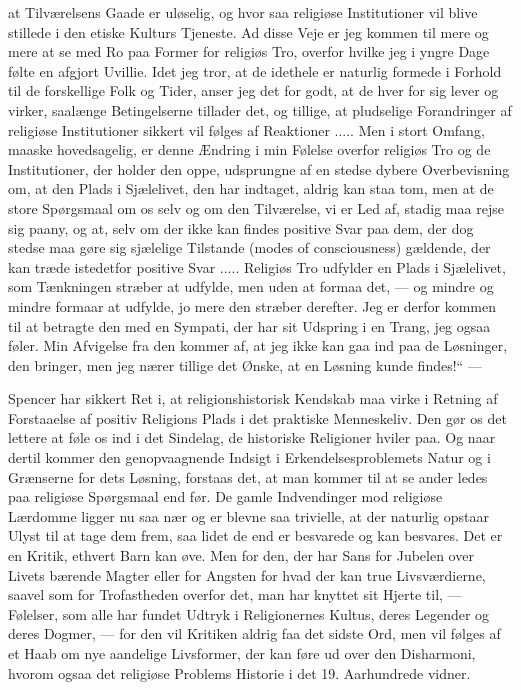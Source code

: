\documentclass[12pt,a4paper,openany]{book}
\newcommand{\opage}[1]{\marginnote{\footnotesize\textit{[#1]}}}
\begin{document}
at Tilværelsens Gaade er uløselig, og hvor saa religiøse Institutioner
vil blive stillede i den etiske Kulturs Tjeneste. Ad disse
Veje er jeg kommen til mere og mere at se med Ro paa Former for
religiøs Tro, overfor hvilke jeg i yngre Dage følte en afgjort Uvillie.
Idet jeg tror, at de idethele er naturlig formede i Forhold til de
forskellige Folk og Tider, anser jeg det for godt, at de hver for sig
lever og virker, saalænge Betingelserne tillader det, og tillige, at
pludselige Forandringer af religiøse Institutioner sikkert vil følges af
Reaktioner ..... Men i stort Omfang, maaske hovedsagelig, er denne
Ændring i min Følelse overfor religiøs Tro og de Institutioner, der
holder den oppe, udsprungne af en stedse dybere Overbevisning om,
at den Plads i Sjælelivet, den har indtaget, aldrig kan staa tom, men
at de store Spørgsmaal om os selv og om den Tilværelse, vi er Led
af, stadig maa rejse sig paany, og at, selv om der ikke kan findes
positive Svar paa dem, der dog stedse maa gøre sig sjælelige Tilstande
(modes of consciousness) gældende, der kan træde istedetfor
positive Svar .....  Religiøs Tro udfylder en Plads i Sjælelivet, som
Tænkningen stræber at udfylde, men uden at formaa det, --- og mindre
og mindre formaar at udfylde, jo mere den stræber derefter.
Jeg er derfor kommen til at betragte den med en Sympati, der har
sit Udspring i en Trang, jeg ogsaa føler. Min Afvigelse fra den kommer
af, at jeg ikke kan gaa ind paa de Løsninger, den bringer, men
jeg nærer tillige det Ønske, at en Løsning kunde findes!“ ---

Spencer har sikkert Ret i, at religionshistorisk Kendskab maa
virke i Retning af Forstaaelse af positiv Religions Plads i det praktiske
Menneskeliv. Den gør os det lettere at føle os ind i det Sindelag,
de historiske Religioner hviler paa. Og naar dertil kommer den
genopvaagnende Indsigt i Erkendelsesproblemets Natur og i Grænserne
for dets Løsning, forstaas det, at man kommer til at se ander%
\opage{151}ledes paa religiøse Spørgsmaal end før. De gamle Indvendinger mod
religiøse Lærdomme ligger nu saa nær og er blevne saa trivielle, at
der naturlig opstaar Ulyst til at tage dem frem, saa lidet de end er
besvarede og kan besvares. Det er en Kritik, ethvert Barn kan øve.
Men for den, der har Sans for Jubelen over Livets bærende Magter
eller for Angsten for hvad der kan true Livsværdierne, saavel som
for Trofastheden overfor det, man har knyttet sit Hjerte til, --- Følelser,
som alle har fundet Udtryk i Religionernes Kultus, deres Legender
og deres Dogmer, --- for den vil Kritiken aldrig faa det sidste Ord, men vil følges af et Haab om nye aandelige Livsformer, der
kan føre ud over den Disharmoni, hvorom ogsaa det religiøse Problems
Historie i det 19. Aarhundrede vidner.
\end{document}

